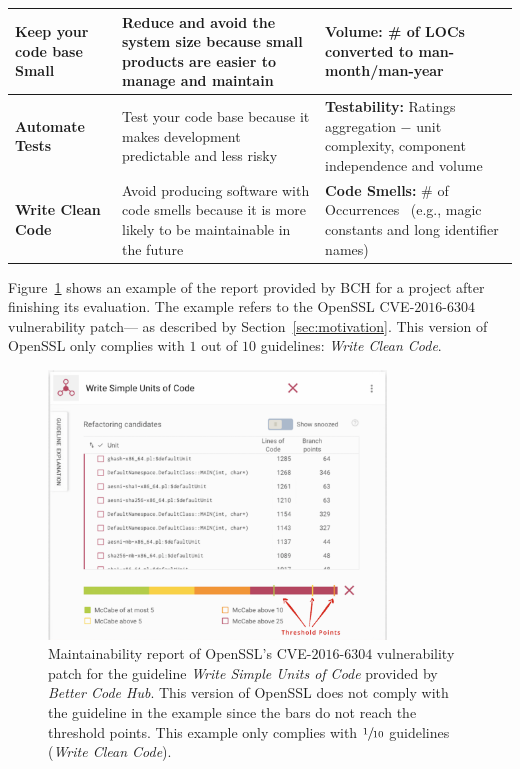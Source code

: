 \documentclass[smallextended]{svjour3}       %
\begin{document}
\begin{table}[h]
\begin{tabular}{L{2cm}L{4.5cm}L{4cm}}
\textbf{Keep your code base Small} & Reduce and avoid the system size because
small products are easier to manage and maintain & \textbf{Volume:} \# of LOCs converted 
to man-month/man-year~\cite{criteria:2017} \\\midrule

\textbf{Automate Tests} & Test your code base because it makes development
predictable and less risky & \textbf{Testability:} Ratings aggregation $-$ unit 
complexity, component independence and volume~\cite{Visser:2016:OREILLY}
 \\\midrule

\textbf{Write Clean Code} & Avoid producing software with code smells because
it is more likely to be maintainable in the future & \textbf{Code Smells:} 
\# of Occurrences~\cite{Visser:2016:OREILLY} (e.g., magic constants and long 
identifier names) \\
\bottomrule
\end{tabular}
\label{tab:guidelines}
\end{table}

Figure~\ref{fig:bchrep} shows an example of the report provided by BCH 
for a project after finishing its evaluation. The example
refers to the OpenSSL CVE-$2016$-$6304$ vulnerability patch---
as described by Section~\ref{sec:motivation}. This version of 
OpenSSL only complies with $1$ out of $10$ guidelines: \emph{Write 
Clean Code}.

\begin{figure}[h]
  \centering  
  \includegraphics[width=0.8\textwidth]{figures/bch_report.png}
  \caption{Maintainability report of OpenSSL's CVE-$2016$-$6304$ 
  vulnerability patch for the guideline \emph{Write Simple Units 
  of Code} provided by \emph{Better Code Hub}. This version of 
  OpenSSL does not comply with the guideline in the example since 
  the bars do not reach the threshold points. This example only 
  complies with $\sfrac{1}{10}$ guidelines (\emph{Write Clean 
  Code}).}
  \label{fig:bchrep}
\end{figure}
\end{document}
